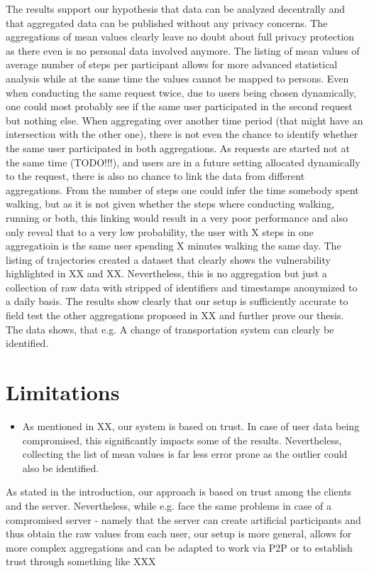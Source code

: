 The results support our hypothesis that data can be analyzed decentrally and that aggregated data can be published without any privacy concerns. The aggregations of mean values clearly leave no doubt about full privacy protection as there even is no personal data involved anymore. The listing of mean values of average number of steps per participant allows for more advanced statistical analysis while at the same time the values cannot be mapped to persons. Even when conducting the same request twice, due to users being chosen dynamically, one could most probably see if the same user participated in the second request but nothing else. When aggregating over another time period (that might have an intersection with the other one), there is not even the chance to identify whether the same user participated in both aggregations. As requests are started not at the same time (TODO!!!), and users are in a future setting allocated dynamically to the request, there is also no chance to link the data from different aggregations. From the number of steps one could infer the time somebody spent walking, but as it is not given whether the steps where conducting walking, running or both, this linking would result in a very poor performance and also only reveal that to a very low probability, the user with X steps in one aggregatioin is the same user spending X minutes walking the same day. 
The listing of trajectories created a dataset that clearly shows the vulnerability highlighted in XX and XX. Nevertheless, this is no aggregation but just a collection of raw data with stripped of identifiers and timestamps anonymized to a daily basis. The results show clearly that our setup is sufficiently accurate to field test the other aggregations proposed in XX and further prove our thesis. The data shows, that e.g. A change of transportation system can clearly be identified. 

\section{Limitations}
\begin{itemize}
	\item As mentioned in XX, our system is based on trust. In case of user data being compromised, this significantly impacts some of the results. Nevertheless, collecting the list of mean values is far less error prone as the outlier could also be identified.
\end{itemize}

As stated in the introduction, our approach is based on trust among the clients and the server. Nevertheless, while e.g. \parencite{crowdsourcing} face the same problems in case of a compromised server - namely that the server can create artificial participants and thus obtain the raw values from each user, our setup is more general, allows for more complex aggregations and can be adapted to work via P2P or to establish trust through something like XXX

